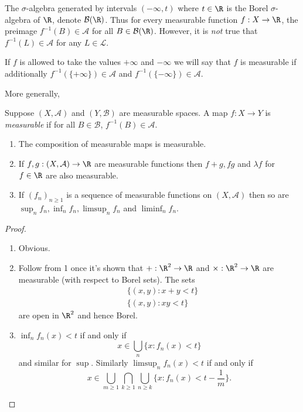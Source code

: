 \documentclass[a4paper]{article}
\begin{document}
\begin{remark}
  The \(\sigma\)-algebra generated by intervals \((-\infty, t)\) where \(t \in \R\) is the Borel \(\sigma\)-algebra of \(\R\), denote \(\mathcal B(\R)\). Thus for every measurable function \(f: X \to \R\), the preimage \(f^{-1}(B) \in \mathcal A\) for all \(B \in \mathcal B(\R)\). However, it is \emph{not} true that \(f^{-1}(L) \in \mathcal A\) for any \(L \in \mathcal L\).
\end{remark}

\begin{remark}
  If \(f\) is allowed to take the values \(+\infty\) and \(-\infty\) we will say that \(f\) is measurable if additionally \(f^{-1}(\{+\infty\}) \in \mathcal A\) and \(f^{-1}(\{-\infty\}) \in \mathcal A\).
\end{remark}

More generally,

\begin{definition}
  Suppose \((X, \mathcal A)\) and \((Y, \mathcal B)\) are measurable spaces. A map \(f: X \to Y\) is \emph{measurable} if for all \(B \in \mathcal B\), \(f^{-1}(B) \in \mathcal A\).
\end{definition}

\begin{proposition}\leavevmode
  \begin{enumerate}
  \item The composition of measurable maps is measurable.
  \item If \(f, g: (X, \mathcal A) \to \R\) are measurable functions then \(f + g, fg\) and \(\lambda f\) for \(f \in \R\) are also measurable.
  \item If \((f_n)_{n \geq 1}\) is a sequence of measurable functions on \((X, \mathcal A)\) then so are \(\sup_n f_n, \inf_n f_n, \limsup_n f_n\) and \(\liminf_n f_n\).
  \end{enumerate}
\end{proposition}

\begin{proof}\leavevmode
  \begin{enumerate}
  \item Obvious.
  \item Follow from 1 once it's shown that \(+: \R^2 \to \R\) and \(\times: \R^2 \to \R\) are measurable (with respect to Borel sets). The sets
    \begin{align*}
      &\{(x, y): x + y < t\} \\
      &\{(x, y): xy < t\}
    \end{align*}
    are open in \(\R^2\) and hence Borel.
  \item \(\inf_n f_n(x) < t\) if and only if
    \[
      x \in \bigcup_n \{x: f_n(x) < t\}
    \]
    and similar for \(\sup\). Similarly \(\limsup_n f_n(x) < t\) if and only if
    \[
      x \in \bigcup_{m \geq 1} \bigcap_{k \geq 1} \bigcup_{n \geq k} \{x: f_n(x) < t - \frac{1}{m}\}.
    \]
  \end{enumerate}
\end{proof}
\end{document}
